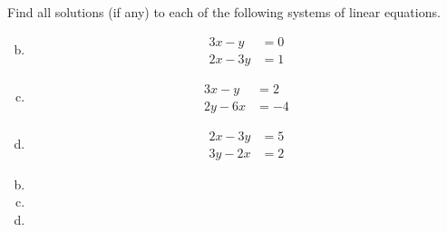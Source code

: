 \documentclass[../main.tex]{subfiles}
\begin{document}
Find all solutions (if any) to each of the following systems of linear equations.
\begin{enumerate}[a)]
	\setcounter{enumi}{1}
	\item 
		\begin{align*}
			3x - y &= 0 \\
			2x - 3y &= 1
		\end{align*}
	\setcounter{enumi}{3}
	\item 
		\begin{align*}
			3x - y &= 2 \\
			2y - 6x &= -4
		\end{align*}
	\setcounter{enumi}{5}
	\item 
		\begin{align*}
			2x - 3y &= 5 \\
			3y - 2x &= 2
		\end{align*}
\end{enumerate}

\solution
\begin{enumerate}[a)]
	\setcounter{enumi}{1}
	\item 
	\setcounter{enumi}{3}
	\item 
	\setcounter{enumi}{5}
	\item 
\end{enumerate}
\end{document}
